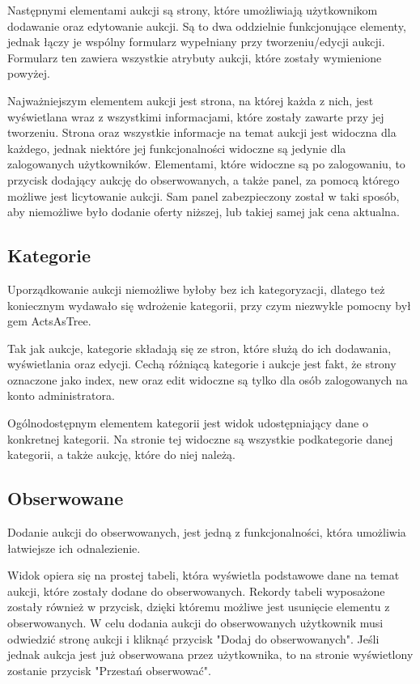 \documentclass[brudnopis]{xmgr}
\begin{document}
Następnymi elementami aukcji są strony, które umożliwiają użytkownikom dodawanie oraz edytowanie aukcji. Są to dwa oddzielnie funkcjonujące elementy, jednak łączy je wspólny formularz wypełniany przy tworzeniu/edycji aukcji. Formularz ten zawiera wszystkie atrybuty aukcji, które zostały wymienione powyżej.

Najważniejszym elementem aukcji jest strona, na której każda z nich, jest wyświetlana wraz z wszystkimi informacjami, które zostały zawarte przy jej tworzeniu. Strona oraz wszystkie informacje na temat aukcji jest widoczna dla każdego, jednak niektóre jej funkcjonalności widoczne są jedynie dla zalogowanych użytkowników. Elementami, które widoczne są po zalogowaniu, to przycisk dodający aukcję do obserwowanych, a także panel, za pomocą którego możliwe jest licytowanie aukcji. Sam panel zabezpieczony został w taki sposób, aby niemożliwe było dodanie oferty niższej, lub takiej samej jak cena aktualna.

\subsection{Kategorie}

Uporządkowanie aukcji niemożliwe byłoby bez ich kategoryzacji, dlatego też koniecznym wydawało się wdrożenie kategorii, przy czym niezwykle pomocny był gem ActsAsTree.

Tak jak aukcje, kategorie składają się ze stron, które służą do ich dodawania, wyświetlania oraz edycji. Cechą różniącą kategorie i aukcje jest fakt, że strony oznaczone jako index, new oraz edit widoczne są tylko dla osób zalogowanych na konto administratora.

Ogólnodostępnym elementem kategorii jest widok udostępniający dane o konkretnej kategorii. Na stronie tej widoczne są wszystkie podkategorie danej kategorii, a także aukcję, które do niej należą.

\subsection{Obserwowane}

Dodanie aukcji do obserwowanych, jest jedną z funkcjonalności, która umożliwia łatwiejsze ich odnalezienie.

Widok opiera się na prostej tabeli, która wyświetla podstawowe dane na temat aukcji, które zostały dodane do obserwowanych. Rekordy tabeli wyposażone zostały również w przycisk, dzięki któremu możliwe jest usunięcie elementu z obserwowanych. W celu dodania aukcji do obserwowanych użytkownik musi odwiedzić stronę aukcji i kliknąć przycisk "Dodaj do obserwowanych". Jeśli jednak aukcja jest już obserwowana przez użytkownika, to na stronie wyświetlony zostanie przycisk "Przestań obserwować".
\end{document}
